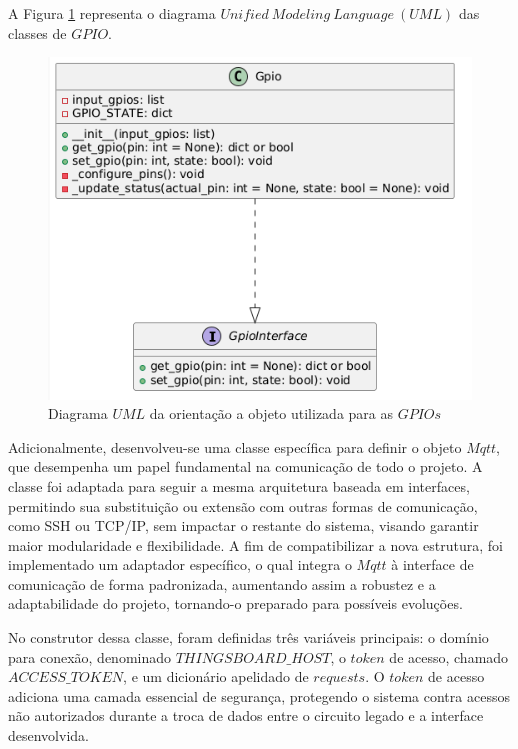 \documentclass{ecatfg}
\begin{document}
A Figura \ref{fig:3} representa o diagrama $Unified\ Modeling\ Language\ (UML)$ \cite{uml} das classes de $GPIO$.\par

\begin{figure}[!htb]
    \centering
    \includegraphics[scale=0.35]{Figuras/diagrama_uml_gpio.png}
    \caption{Diagrama $UML$ da orientação a objeto utilizada para as $GPIOs$}
    \label{fig:3}
\end{figure}

Adicionalmente, desenvolveu-se uma classe específica para definir o objeto $Mqtt$, que desempenha um papel fundamental na comunicação de todo o projeto. A classe foi adaptada para seguir a mesma arquitetura baseada em interfaces, permitindo sua substituição ou extensão com outras formas de comunicação, como SSH ou TCP/IP, sem impactar o restante do sistema, visando garantir maior modularidade e flexibilidade. A fim de compatibilizar a nova estrutura, foi implementado um adaptador específico, o qual integra o $Mqtt$ à interface de comunicação de forma padronizada, aumentando assim a robustez e a adaptabilidade do projeto, tornando-o preparado para possíveis evoluções. \par

No construtor dessa classe, foram definidas três variáveis principais: o domínio para conexão, denominado $THINGSBOARD\_HOST$, o $token$ de acesso, chamado $ACCESS\_TOKEN$, e um dicionário apelidado de $requests$. O $token$ de acesso adiciona uma camada essencial de segurança, protegendo o sistema contra acessos não autorizados durante a troca de dados entre o circuito legado e a interface desenvolvida.\par
\end{document}

